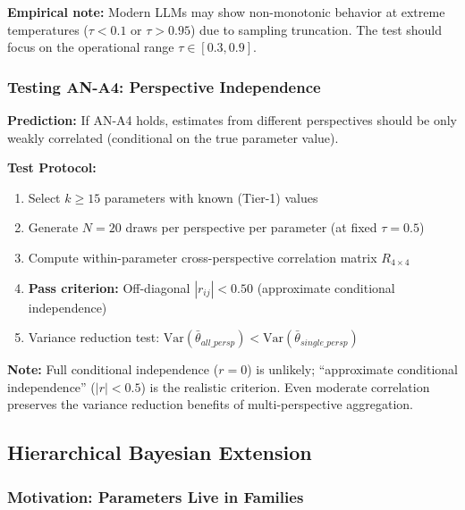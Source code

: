 \textbf{Empirical note:} Modern LLMs may show non-monotonic behavior at extreme
temperatures ($\tau < 0.1$ or $\tau > 0.95$) due to sampling truncation.
The test should focus on the operational range $\tau \in [0.3, 0.9]$.

\subsubsection{Testing AN-A4: Perspective Independence}
\label{sec:AN-test-A4}

\textbf{Prediction:} If AN-A4 holds, estimates from different perspectives should be
only weakly correlated (conditional on the true parameter value).

\textbf{Test Protocol:}
\begin{enumerate}[nosep]
    \item Select $k \geq 15$ parameters with known (Tier-1) values
    \item Generate $N = 20$ draws per perspective per parameter (at fixed $\tau = 0.5$)
    \item Compute within-parameter cross-perspective correlation matrix $R_{4 \times 4}$
    \item \textbf{Pass criterion:} Off-diagonal $|r_{ij}| < 0.50$
          (approximate conditional independence)
    \item Variance reduction test:
          $\text{Var}(\bar{\theta}_{all\_persp}) < \text{Var}(\bar{\theta}_{single\_persp})$
\end{enumerate}

\textbf{Note:} Full conditional independence ($r = 0$) is unlikely; ``approximate
conditional independence'' ($|r| < 0.5$) is the realistic criterion. Even moderate
correlation preserves the variance reduction benefits of multi-perspective aggregation.


\subsection{Hierarchical Bayesian Extension}
\label{sec:AN-hierarchical}

\subsubsection{Motivation: Parameters Live in Families}

